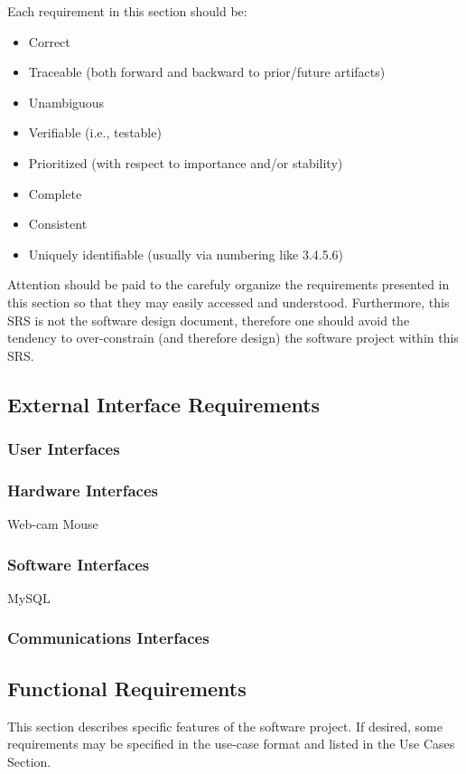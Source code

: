 \documentclass[titlepage]{article}
\begin{document}
Each requirement in this section should be:
\begin{itemize}
	\item Correct
	\item Traceable (both forward and backward to prior/future artifacts)
	\item Unambiguous
	\item Verifiable (i.e., testable)
	\item Prioritized (with respect to importance and/or stability)
	\item Complete
	\item Consistent
	\item Uniquely identifiable (usually via numbering like 3.4.5.6)
\end{itemize}

Attention should be paid to the carefuly organize the requirements presented in this section so that they may easily accessed and understood.  Furthermore, this SRS is not the software design document, therefore one should avoid the tendency to over-constrain (and therefore design) the software project within this SRS.

\subsection{External Interface Requirements}

\subsubsection{User Interfaces}

\subsubsection{Hardware Interfaces}
Web-cam
Mouse

\subsubsection{Software Interfaces}
MySQL

\subsubsection{Communications Interfaces}

\subsection{Functional Requirements}
This section describes specific features of the software project.  If desired, some requirements may be specified in the use-case format and listed in the Use Cases Section.
\end{document}
